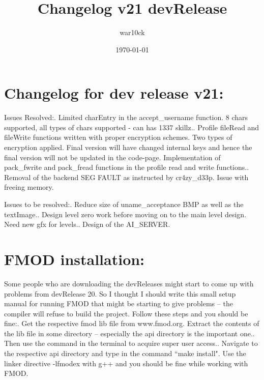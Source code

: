 \documentclass[a4paper]{article}
\begin{document}
\title{Changelog v21 devRelease}	%
\author{war10ck}	%
\date{\today}
\maketitle

\section{Changelog for dev release v21:}
Issues Resolved:. Limited charEntry in the accept\_username function. 8 chars supported, all types of chars supported - can has 1337 skillz.. Profile fileRead and fileWrite functions written with proper encryption schemes. Two types of encryption applied. Final version will have changed internal keys and hence the final version will not be updated in the code-page. Implementation of pack\_fwrite and pack\_fread functions in the profile read and write functions.. Removal of the backend SEG FAULT as instructed by cr4zy\_d33p. Issue with freeing memory.\newline

Issues to be resolved:. Reduce size of uname\_acceptance BMP as well as the textImage.. Design level zero work before moving on to the main level design. Need new gfx for levels.. Design of the AI\_SERVER.\newline

\section{FMOD installation:}
Some people who are downloading the devReleases might start to come up with problems from devRelease 20. So I thought I should write this small setup manual for running FMOD that might be starting to give problems -- the compiler will refuse to build the project. Follow these steps and you should be fine:. Get the respective fmod lib file from www.fmod.org. Extract the contents of the lib file in some directory -- especially the api directory is the important one.. Then use the command in the terminal to acquire super user access.. Navigate to the respective api directory and type in the command ``make install".\newline
Use the linker directive -lfmodex with g++ and you should be fine while working with FMOD.\newline
\end{document}
